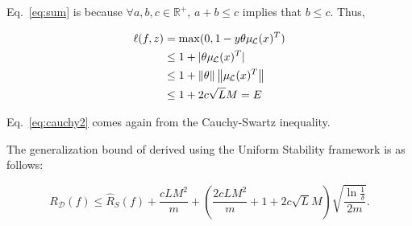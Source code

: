 Eq.~\eqref{eq:sum} is because $ \forall a,b,c \in \mathbb{R}^{+}$, $ a + b \leq c $ implies that $ b \leq c $. Thus,

\begin{align}
    \ell(f,z) &= \max(0,1-y \theta \mul{x}^T) \nonumber \\
    & \leq 1 + \abs{\theta \mul{x}^T} \nonumber \\
    & \leq 1 + \norm{\theta} \norm{\mul{x}^T}  \label{eq:cauchy2}\\
    & \leq 1 + 2c \sqrt{L} M = E \nonumber
\end{align}

Eq.~\eqref{eq:cauchy2} comes again from the Cauchy-Swartz inequality.

\begin{cor}
    The generalization bound of \landSVM derived using the Uniform Stability framework is as follows:

    \small{
    $$ R_{\mathcal{D}}(f)\! \leq \!\hat{R}_{S}(f) + \frac{c L M^2}{m} + \left( \frac{2c L M^2}{m} \!+ \!1 \!+\! 2c \sqrt{L} M \! \right)\!\!\sqrt{\frac{\ln \frac{1}{\delta}}{2m}}.$$}

\end{cor}


